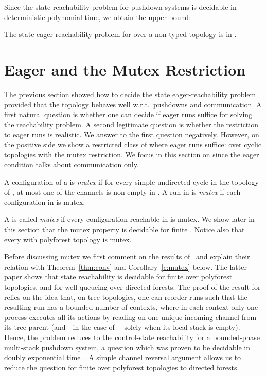 \documentclass{LMCS}
\newenvironment{definition}{\begin{defi}}{\end{defi}}
\newenvironment{proposition}{\begin{prop}}{\end{prop}}
\begin{document}
Since the state reachability problem for pushdown systems is decidable in
deterministic polynomial time, we obtain the upper bound:

\begin{proposition}\label{prop:eager-upperb}
  The state eager-reachability problem for \rqcp over a
  non-\converging typed topology  is in \dexptime.
\end{proposition}
 \section{Eager \qcp and the Mutex Restriction}
\label{sect:mutex}

The previous section showed how to decide the state
eager-reachability problem provided that the topology behaves well
w.r.t.~pushdowns and communication. A
first natural question is whether one can decide if eager runs
suffice for solving the reachability problem. A second legitimate
question is whether the restriction to eager runs is realistic. We
answer to the first question negatively.  However, on the positive
side we show a restricted class of \qcp where eager runs suffice:
\qcp over cyclic topologies with the mutex restriction. We focus in
this section
on \qcp since the eager condition talks about communication only.

\begin{definition}
   A configuration  of a \qcp  is \emph{mutex} if for every simple
   undirected cycle  in the topology of
   , at most one of the channels  is non-empty in .
   A run  in  is \emph{mutex} if each configuration in
    is mutex.
\end{definition}
A \qcp  is called \emph{mutex} if every configuration reachable in
 is mutex.
We show later in this section that the mutex property is decidable for
finite \qcp.
Notice also that every \qcp with polyforest topology is mutex.

\smallskip

Before discussing mutex we first comment on the results
of~\cite{latorre-s-2008-299-a} and explain their relation with
Theorem~\ref{thm:conv} and Corollary~\ref{c:mutex} below.
The latter paper shows that state reachability is
decidable for finite \qcp over polyforest topologies, and for
well-queueing \rqcp over directed forests.  The proof of the result
for \rqcp relies on the idea that, on tree topologies, one can
reorder runs such that the resulting run has a bounded
number of contexts, where in each context only
one process executes all its actions by reading on one unique
incoming channel from its tree parent (and---in the case of
\rqcp---solely when its local stack is empty). Hence, the
problem reduces to the control-state reachability for a bounded-phase
multi-stack pushdown system, a question which was proven to be decidable in
doubly exponential time~\cite{latorre-s-2007-161-a}. A simple channel
reversal argument allows us to reduce the question for finite \qcp over
polyforest topologies to directed forests.
\end{document}
